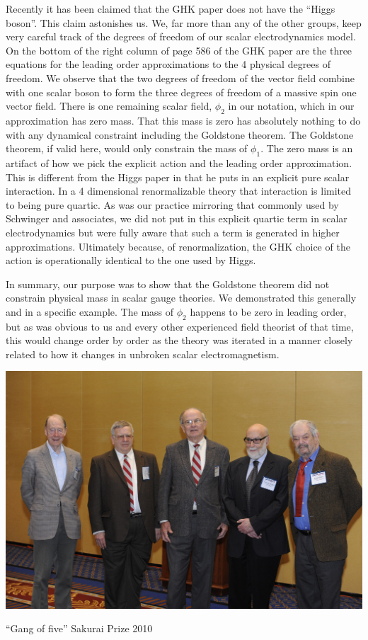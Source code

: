 \documentclass[letterpaper,twoside,preprintnumbers,slac_one]{revtex4}
\begin{document}
Recently it has been claimed that the GHK paper
does not have the ``Higgs boson''. This claim astonishes us. We, far
more than any of the other groups, keep very careful track of the
degrees of freedom of our scalar electrodynamics model. On the bottom
of the right column of page 586 of the GHK paper are the three
equations for the leading order approximations to the 4 physical
degrees of freedom. We observe that the two degrees of freedom of the
vector field combine with one scalar boson to form the three degrees
of freedom of a massive spin one vector field. There is one remaining
scalar field, $\phi_2$ in our notation, which in our approximation has
zero mass. That this mass is zero has absolutely nothing to do with any
dynamical constraint including the Goldstone theorem. The Goldstone
theorem, if valid here, would only constrain the mass of $\phi_1$. The
zero mass is an artifact of how we pick the explicit action and the
leading order approximation. This is different from the Higgs paper in
that he puts in an explicit pure scalar interaction.  In a 4
dimensional renormalizable theory that interaction is limited to being
pure quartic. As was our practice mirroring that commonly used by
Schwinger and associates, we did not put in this explicit quartic term
in scalar electrodynamics but were fully aware that such a term is
generated in higher approximations. Ultimately because, of renormalization, the GHK
choice of the action is operationally identical to the one used by Higgs.

 In summary, our purpose was to show that the Goldstone
theorem did not constrain physical mass in scalar gauge theories. We
demonstrated this generally and in a specific example. The mass of
$\phi_2$ happens to be zero in leading order, but as was obvious to us
and every other experienced field theorist of that time, this would
change order by order as the theory was iterated in a manner closely
related to how it changes in unbroken scalar
electromagnetism. 


\begin{center}
  \includegraphics[scale=0.26]{sp.jpg}

  ``Gang of five'' Sakurai Prize 2010
\end{center}
\end{document}
